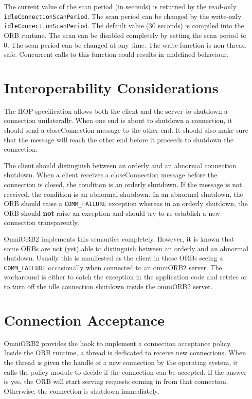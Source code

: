 \documentclass[11pt,twoside,onecolumn]{book}
\begin{document}
The current value of the scan period (in seconds) is returned by the
read-only {\tt idleConnectionScanPeriod}. The scan period can be changed by
the write-only {\tt idleConnectionScanPeriod}. The default value (30
seconds) is compiled into the ORB runtime. The scan can be disabled
completely by setting the scan period to 0. The scan period can be changed
at any time. The write function is non-thread safe. Concurrent calls to
this function could results in undefined behaviour.

\section{Interoperability Considerations}

The IIOP specification allows both the client and the server to shutdown a
connection unilaterally. When one end is about to shutdown a connection,
it should send a closeConnection message to the other end. It should also make
sure that the message will reach the other end before it proceeds to
shutdown the connection. 

The client should distinguish between an orderly and an abnormal connection
shutdown. When a client receives a closeConnection message before the
connection is closed, the condition is an orderly shutdown. If the message
is not received, the condition is an abnormal shutdown. In an abnormal
shutdown, the ORB should raise a {\tt COMM\_FAILURE} exception whereas in
an orderly shutdown, the ORB should {\bf not} raise an exception and should
try to re-establish a new connection transparently.

OmniORB2 implements this semantics completely. However, it is known that
some ORBs are not (yet) able to distinguish between an orderly and an
abnormal shutdown. Usually this is manifested as the client in these ORBs
seeing a {\tt COMM\_FAILURE} occasionally when connected to an omniORB2
server. The workaround is either to catch the exception in the application
code and retries or to turn off the idle connection shutdown inside the
omniORB2 server.


\section{Connection Acceptance}
\label{sec_accept}

OmniORB2 provides the hook to implement a connection acceptance
policy. Inside the ORB runtime, a thread is dedicated to receive new
connections. When the thread is given the handle of a new connection by
the operating system, it calls the policy module to decide if the
connection can be accepted. If the answer is yes, the ORB will start
serving requests coming in from that connection. Otherwise, the connection
is shutdown immediately.
\end{document}
